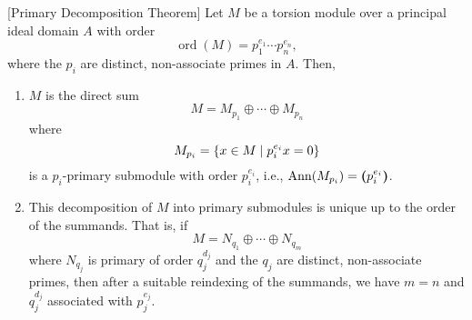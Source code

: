 \begin{thm}\label{thm:primary-decomposition}
    {\rm[Primary Decomposition Theorem]}
    Let\/ $M$ be a torsion module over a principal ideal domain\/ $A$ with order
    $$
        \operatorname{ord}(M) = p_1^{e_1} \cdots p_n^{e_n},
    $$
    where the\/ $p_i$ are distinct, non-associate primes in\/ $A$. Then,
    \begin{enumerate}[\rm a)]
        \item $M$ is the direct sum
        $$
            M = M_{p_1} \oplus \cdots \oplus M_{p_n}
        $$
        where
        $$
            M_{p_i} = \{ x \in M\mid p_i^{e_i} x = 0\}
        $$
        is a\/ $p_i$-primary submodule with order\/ $p_i^{e_i}$, i.e., $\operatorname{\operatorname{Ann}}(M_{p_i}) =\textrm{\boldmath$($}p_i^{e_i}\textrm{\boldmath$)$}$.
    
        \item This decomposition of\/ $M$ into primary submodules is unique up to the order of the summands. That is, if
        $$
            M = N_{q_1} \oplus \cdots \oplus N_{q_m}
        $$
        where\/ $N_{q_j}$ is primary of order\/ $q_j^{d_j}$ and the\/ $q_j$ are distinct, non-associate primes, then after a suitable reindexing of the summands, we have\/ $m = n$ and\/ $q_j^{d_j}$ associated with\/ $p_j^{e_j}$.
    \end{enumerate}
\end{thm}

